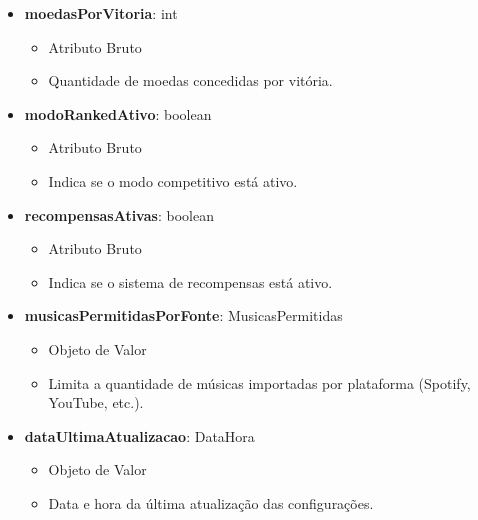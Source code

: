\begin{itemize}
        \item \textbf{moedasPorVitoria}: int  
              \begin{itemize}
                  \item Atributo Bruto
                  \item Quantidade de moedas concedidas por vitória.
              \end{itemize}
    
        \item \textbf{modoRankedAtivo}: boolean  
              \begin{itemize}
                  \item Atributo Bruto
                  \item Indica se o modo competitivo está ativo.
              \end{itemize}
    
        \item \textbf{recompensasAtivas}: boolean  
              \begin{itemize}
                  \item Atributo Bruto
                  \item Indica se o sistema de recompensas está ativo.
              \end{itemize}
    
        \item \textbf{musicasPermitidasPorFonte}: MusicasPermitidas  
              \begin{itemize}
                  \item Objeto de Valor
                  \item Limita a quantidade de músicas importadas por plataforma (Spotify, YouTube, etc.).
              \end{itemize}
    
        \item \textbf{dataUltimaAtualizacao}: DataHora  
              \begin{itemize}
                  \item Objeto de Valor
                  \item Data e hora da última atualização das configurações.
              \end{itemize}
    \end{itemize}
    
